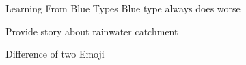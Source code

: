 \documentclass[
  ignorenonframetext,
]{beamer}
\begin{document}
\begin{frame}{Learning From Blue Types}
\protect\hypertarget{learning-from-blue-types}{}
Blue type always does worse

Provide story about rainwater catchment

Difference of two Emoji

\begin{figure}

\begin{minipage}[t]{0.14\linewidth}

{\centering 


}

\end{minipage}%
%
\begin{minipage}[t]{0.14\linewidth}

{\centering 


}

\end{minipage}%
%
\begin{minipage}[t]{0.14\linewidth}

{\centering 

}
\end{minipage}
\end{figure}
\end{frame}
\end{document}
